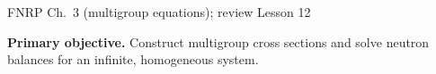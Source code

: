 \providecommand{\dd}{\,\mathrm{d}}
\AtBeginDocument{%
\setlength{\abovedisplayskip}{4pt plus 1pt minus 1pt}
\setlength{\belowdisplayskip}{4pt plus 1pt minus 1pt}
\setlength{\abovedisplayshortskip}{3pt plus 1pt}
\setlength{\belowdisplayshortskip}{3pt plus 1pt}
\setlength{\jot}{2pt}
}

  {FNRP Ch.~3 (multigroup equations); review Lesson 12}

\MakeHandoutTitle
\textcolor{KSUDeepPurple}{\textbf{Primary objective.}}
Construct multigroup cross sections and solve neutron balances
for an infinite, homogeneous system.
\par\vspace{5pt}


